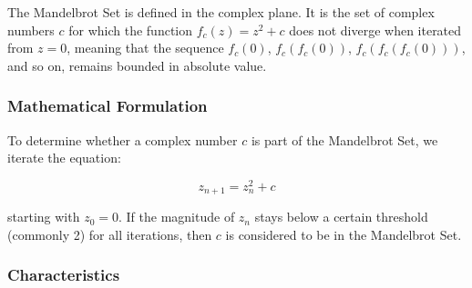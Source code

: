 \documentclass[
]{article}
\begin{document}
The Mandelbrot Set is defined in the complex plane. It is the set of
complex numbers \(c\) for which the function \(f_c(z) = z^2 + c\) does
not diverge when iterated from \(z = 0\), meaning that the sequence
\(f_c(0)\), \(f_c(f_c(0))\), \(f_c(f_c(f_c(0)))\), and so on, remains
bounded in absolute value.

\subsubsection{Mathematical Formulation}\label{mathematical-formulation}

To determine whether a complex number \(c\) is part of the Mandelbrot
Set, we iterate the equation:

\[ z_{n+1} = z_n^2 + c \]

starting with \(z_0 = 0\). If the magnitude of \(z_n\) stays below a
certain threshold (commonly 2) for all iterations, then \(c\) is
considered to be in the Mandelbrot Set.

\subsubsection{Characteristics}\label{characteristics}
\end{document}
